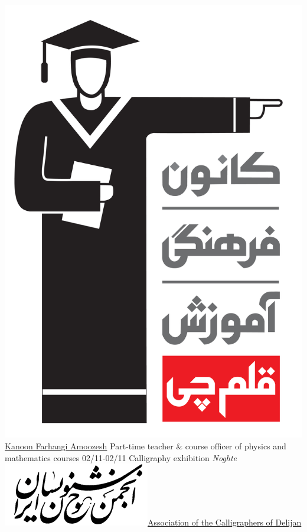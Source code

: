 \documentclass[a4paper]{friggeri-cv}
\begin{document}
\begin{entrylist}
        {\href{http://www.kanoon.ir/}{\includegraphics[scale=0.005]{../assets/images/logos/Kanoon_logo.png} Kanoon Farhangi Amoozesh}}
        {Part-time teacher \& course officer of physics and mathematics courses}
        \entry
        {02/11-02/11}
        {    Calligraphy exhibition \emph{Noghte}}
        {\href{http://calligraphers.ir/}{\includegraphics[scale=0.15]{../assets/images/logos/Khoshnevisan_logo.png}Association of the Calligraphers of Delijan}}

\end{entrylist}
\end{document}

